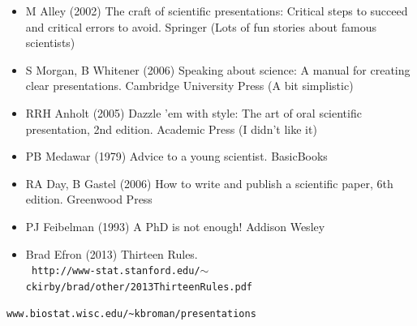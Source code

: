 \documentclass[12pt]{article}
\newcommand{\smallestsize}{\fontsize{18}{22} \selectfont}
\begin{document}
\hfill \begin{minipage}{10in}

\begin{itemize}
\setlength{\rightskip}{0pt plus 1fil} %
\itemsep12pt
\item M Alley (2002) The craft of scientific presentations: Critical
  steps to succeed and critical errors to avoid.  Springer
{\color{myblue} \smallestsize (Lots of fun stories about famous scientists)}


\item S Morgan, B Whitener (2006) Speaking about science: A manual for
  creating clear presentations.  Cambridge University Press 
{\color{myblue} \smallestsize (A bit simplistic)}

\item RRH Anholt (2005) Dazzle 'em with style: The art of oral
  scientific presentation, 2nd edition.  Academic Press 
{\color{myblue} \smallestsize (I didn't like it)}

\item PB Medawar (1979) Advice to a young scientist.  BasicBooks

\item RA Day, B Gastel (2006) How to write and publish a scientific
  paper, 6th edition.  Greenwood Press


\item PJ Feibelman (1993) A PhD is not enough!  Addison Wesley

\item Brad Efron (2013) Thirteen Rules. \\
{\color{myblue} \tt \smallestsize http://www-stat.stanford.edu/$\sim$ckirby/brad/other/2013ThirteenRules.pdf}

\end{itemize}
\end{minipage}

\vfill

\hfill
{\color{myblue} \smallestsize
\verb|www.biostat.wisc.edu/~kbroman/presentations|}

\vspace{5mm}
\end{document}
